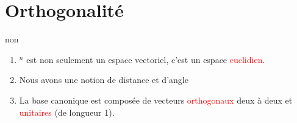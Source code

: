 \chapter{Orthogonalité}
\begin{parag}{non}
    

\begin{enumerate}
    \item \R$^n$ est non seulement un espace vectoriel, c'est un espace \textcolor{red}{euclidien}.
    \item  Nous avons une notion de distance et d'angle
    \item La base canonique est composée de vecteurs \textcolor{red}{orthogonaux} deux à deux et \textcolor{red}{unitaires} (de longueur 1).
\end{enumerate}

\end{parag}

